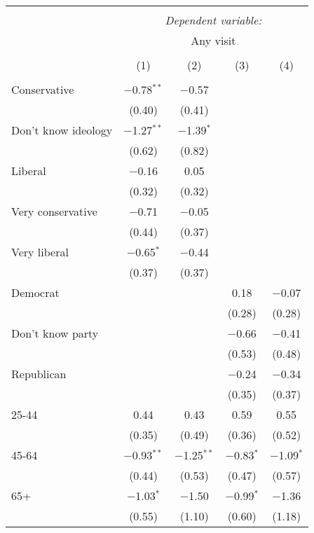 
\begin{table}[!htbp] \centering 
  \caption{} 
  \label{} 
\small 
\begin{tabular}{@{\extracolsep{5pt}}lcccc} 
\\[-1.8ex]\hline 
\hline \\[-1.8ex] 
 & \multicolumn{4}{c}{\textit{Dependent variable:}} \\ 
\cline{2-5} 
 & \multicolumn{4}{c}{Any visit} \\ 
\\[-1.8ex] & (1) & (2) & (3) & (4)\\ 
\hline \\[-1.8ex] 
 Conservative & $-$0.78$^{**}$ & $-$0.57 &  &  \\ 
  & (0.40) & (0.41) &  &  \\ 
  Don't know ideology & $-$1.27$^{**}$ & $-$1.39$^{*}$ &  &  \\ 
  & (0.62) & (0.82) &  &  \\ 
  Liberal & $-$0.16 & 0.05 &  &  \\ 
  & (0.32) & (0.32) &  &  \\ 
  Very conservative & $-$0.71 & $-$0.05 &  &  \\ 
  & (0.44) & (0.37) &  &  \\ 
  Very liberal & $-$0.65$^{*}$ & $-$0.44 &  &  \\ 
  & (0.37) & (0.37) &  &  \\ 
  Democrat &  &  & 0.18 & $-$0.07 \\ 
  &  &  & (0.28) & (0.28) \\ 
  Don't know party &  &  & $-$0.66 & $-$0.41 \\ 
  &  &  & (0.53) & (0.48) \\ 
  Republican &  &  & $-$0.24 & $-$0.34 \\ 
  &  &  & (0.35) & (0.37) \\ 
  25-44 & 0.44 & 0.43 & 0.59 & 0.55 \\ 
  & (0.35) & (0.49) & (0.36) & (0.52) \\ 
  45-64 & $-$0.93$^{**}$ & $-$1.25$^{**}$ & $-$0.83$^{*}$ & $-$1.09$^{*}$ \\ 
  & (0.44) & (0.53) & (0.47) & (0.57) \\ 
  65+ & $-$1.03$^{*}$ & $-$1.50 & $-$0.99$^{*}$ & $-$1.36 \\ 
  & (0.55) & (1.10) & (0.60) & (1.18) \\ 

\end{tabular}
\end{table}
